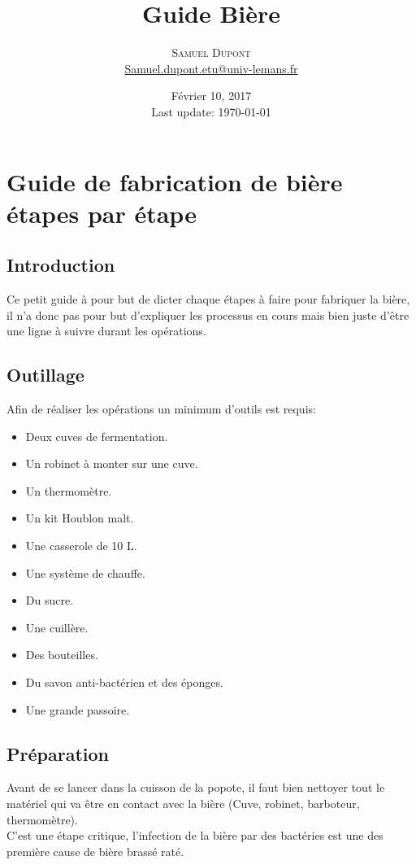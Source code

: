 \documentclass[twoside,twocolumn]{report}
\title{Guide Bière } %
\author{%
\textsc{Samuel Dupont}\\ %
\normalsize \href{mailto:Samuel.dupont.etu@univ-lemans.fr}{Samuel.dupont.etu@univ-lemans.fr } 
}
\date{Février 10, 2017 \\ Last update: \today}
\begin{document}
\maketitle

\chapter*{Guide de fabrication de bière étapes par étape}
	\section{Introduction}
		Ce petit guide à pour but de dicter chaque étapes à faire pour fabriquer la bière, il n'a donc pas pour but d'expliquer les processus en cours mais bien juste d'être une ligne à suivre durant les opérations.
		
	\section{Outillage}
			Afin de réaliser les opérations un minimum d'outils est requis: 
			\begin{itemize}
				\item Deux cuves de fermentation.
				\item Un robinet à monter sur une cuve.
				\item Un thermomètre.
				\item Un kit Houblon malt.
				\item Une casserole de 10 L.
				\item Une système de chauffe.
				\item Du sucre.
				\item Une cuillère.
				\item Des bouteilles.	
				\item Du savon anti-bactérien et des éponges.
				\item Une  grande passoire.	 
		\end{itemize}
		
	\section{Préparation}
		 Avant de se lancer dans la cuisson de la popote, il faut bien nettoyer tout le matériel qui va être en contact avec la bière (Cuve, robinet, barboteur, thermomètre).\\
		 C'est une étape critique, l'infection de la bière par des bactéries est une des première cause de bière brassé raté.
	
\end{document}
